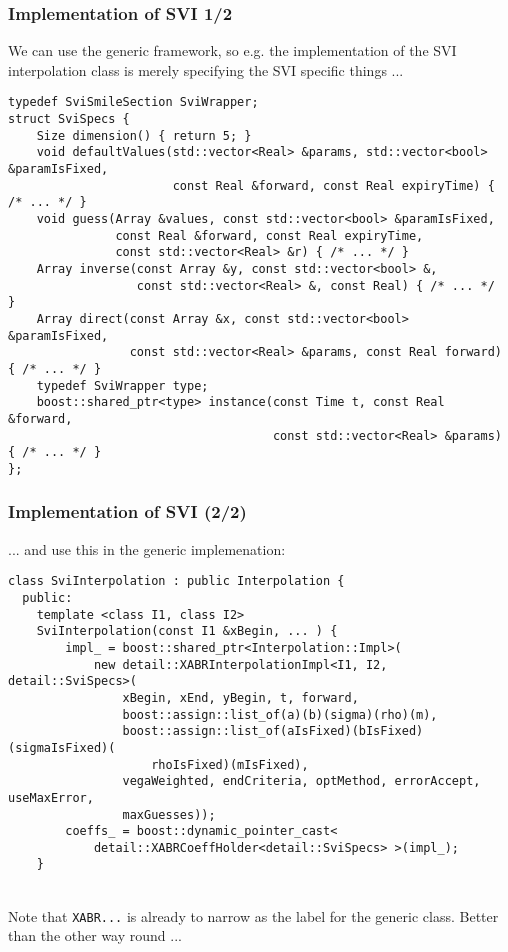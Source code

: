 \documentclass{beamer}
\begin{document}
\begin{frame}[fragile]
\frametitle{Implementation of SVI 1/2}
We can use the generic framework, so e.g. the implementation of the SVI interpolation class is merely specifying the SVI specific things ...
\vspace{2mm}
\begin{verbatim}
typedef SviSmileSection SviWrapper;
struct SviSpecs {
    Size dimension() { return 5; }
    void defaultValues(std::vector<Real> &params, std::vector<bool> &paramIsFixed,
                       const Real &forward, const Real expiryTime) { /* ... */ }
    void guess(Array &values, const std::vector<bool> &paramIsFixed,
               const Real &forward, const Real expiryTime,
               const std::vector<Real> &r) { /* ... */ }
    Array inverse(const Array &y, const std::vector<bool> &,
                  const std::vector<Real> &, const Real) { /* ... */  }
    Array direct(const Array &x, const std::vector<bool> &paramIsFixed,
                 const std::vector<Real> &params, const Real forward) { /* ... */ }
    typedef SviWrapper type;
    boost::shared_ptr<type> instance(const Time t, const Real &forward,
                                     const std::vector<Real> &params) { /* ... */ }
};
\end{verbatim}
\end{frame}

\begin{frame}[fragile]
\frametitle{Implementation of SVI (2/2)}
... and use this in the generic implemenation:
\vspace{2mm}
\begin{verbatim}
class SviInterpolation : public Interpolation {
  public:
    template <class I1, class I2>
    SviInterpolation(const I1 &xBegin, ... ) {
        impl_ = boost::shared_ptr<Interpolation::Impl>(
            new detail::XABRInterpolationImpl<I1, I2, detail::SviSpecs>(
                xBegin, xEnd, yBegin, t, forward,
                boost::assign::list_of(a)(b)(sigma)(rho)(m),
                boost::assign::list_of(aIsFixed)(bIsFixed)(sigmaIsFixed)(
                    rhoIsFixed)(mIsFixed),
                vegaWeighted, endCriteria, optMethod, errorAccept, useMaxError,
                maxGuesses));
        coeffs_ = boost::dynamic_pointer_cast<
            detail::XABRCoeffHolder<detail::SviSpecs> >(impl_);
    }
\end{verbatim}
\\
\vspace{2mm}
Note that \verb+XABR...+ is already to narrow as the label for the generic class. Better than the other way round ...
\end{frame}
\end{document}
